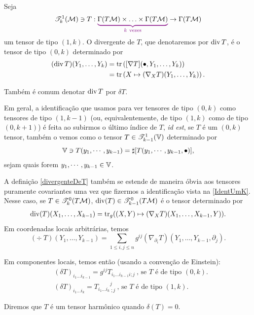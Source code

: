   \begin{deff}\label{divergenteDeT}
    Seja 
    \[
    \T^{1}_{k}(\mm) \ni T: \Munderbrace{\Gamma(T\mm) \times \ldots \times \Gamma(T \mm)}{k \ \text{vezes}} \to \Gamma(T \mm)
    \]
    um tensor de tipo $(1, k)$. O divergente de $T$, que denotaremos por $\operatorname{div} T$, é o tensor de tipo $(0, k)$ determinado por
    \[\begin{aligned}
    (\operatorname{div} T)(Y_1, \ldots, Y_k) &= \operatorname{tr}\left( [\nabla T](\bullet, Y_1, \ldots, Y_k) \right) \\ 
    &= \operatorname{tr}\left(X \mapsto (\nabla_X T)(Y_1, \ldots, Y_k) \right).
    \end{aligned} 
    \]
    \end{deff}

    \begin{oobs}\label{DeltaT}
      Também é comum denotar $\operatorname{div} T$ por $\delta T$.
      \end{oobs}

      \begin{oobs}\label{IdentUmK}
        Em geral, a identificação que usamos para ver tensores de tipo $(0, k)$ como tensores de tipo $(1, k-1)$ (ou, equivalentemente, de tipo $(1, k)$ como de tipo $(0,k+1)$) é feita ao subirmos o último índice de $T$, \emph{id est}, se $T$ é um $(0, k)$ tensor, também o vemos como o tensor $T \in \mathscr{T}^{1}_{k-1}(\mathbb{V})$ determinado por 
        \[
        \mathbb{V} \ni T(y_1, \cdots, y_{k-1}) = \sharp[T(y_1, \cdots, y_{k-1}, \bullet)],
        \]
        sejam quais forem $y_1, \cdots, y_{k-1} \in \mathbb{V}$.
        \end{oobs}

      \begin{oobs}
        A definição \cref{divergenteDeT} também se estende de maneira óbvia aos tensores puramente covariantes uma vez que fizermos a identificação vista na \cref{IdentUmK}. Nesse caso, se $T \in \mathscr{T}^0_k(T \mathcal{M})$, $\mathrm{div}(T) \in \mathscr{T}^{0}_{k-1}(T \mathcal{M})$ é o tensor determinado por
        \[ \begin{aligned}
        \mathrm{div}(T)(X_1, \ldots, X_{k-1}) &= \operatorname{tr}_g((X, Y) \mapsto (\nabla_X T)(X_1, \ldots, X_{k-1}, Y)). \\
        \end{aligned}
        \]
        Em coordenadas locais arbitrárias, temos
        \[
        (\div \ T)(Y_1, \ldots, Y_{k-1}) = \sum_{1 \leq i, j \leq n} g^{ij} (\nabla_{\partial_i} T)(Y_1, \ldots, Y_{k-1}, \partial_j) .
        \]
        \end{oobs}
        \begin{oobs}
        Em componentes locais, temos então (usando a convenção de Einstein):
        \[ \begin{aligned}
        &(\delta T)_{i_1 \ldots i_{k-1}} = g^{ij} T_{i_1 \ldots i_{k-1} i ; j} \ \text{, se $T$ é de tipo $(0, k)$.} \\
        &(\delta T)_{i_1 \ldots i_k} = T_{i_1 \ldots i_k}{}^{j}_{\ ;j} \ \text{, se $T$ é de tipo $(1, k)$.}
        \end{aligned}
        \]
        \end{oobs}
        \begin{deff}
        Diremos que $T$ é um tensor harmônico quando $\delta(T) = 0$.
        \end{deff}

